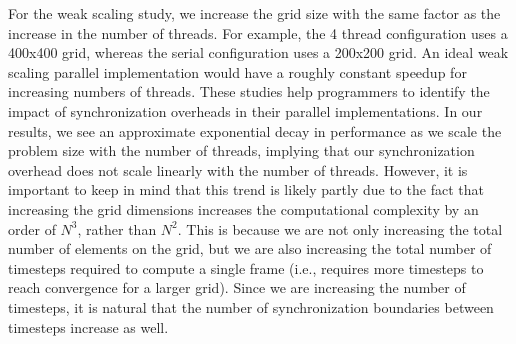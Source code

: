 For the weak scaling study, we increase the grid size with the same
factor as the increase in the number of threads. For example, the 4
thread configuration uses a 400x400 grid, whereas the serial
configuration uses a 200x200 grid. An ideal weak scaling parallel
implementation would have a roughly constant speedup for increasing
numbers of threads. These studies help programmers to identify the impact
of synchronization overheads in their parallel implementations. In our
results, we see an approximate exponential decay in performance as we
scale the problem size with the number of threads, implying that our
synchronization overhead does not scale linearly with the number of
threads. However, it is important to keep in mind that this trend is
likely partly due to the fact that increasing the grid dimensions
increases the computational complexity by an order of $N^3$, rather than
$N^2$. This is because we are not only increasing the total number of
elements on the grid, but we are also increasing the total number of
timesteps required to compute a single frame (i.e., requires more
timesteps to reach convergence for a larger grid). Since we are
increasing the number of timesteps, it is natural that the number of
synchronization boundaries between timesteps increase as well.


